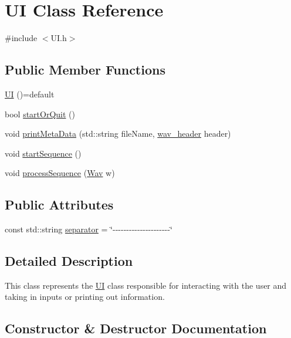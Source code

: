 \hypertarget{classUI}{}\section{UI Class Reference}
\label{classUI}


{\ttfamily \#include $<$U\+I.\+h$>$}

\subsection*{Public Member Functions}
\begin{DoxyCompactItemize}
\item 
\hyperlink{classUI_a3cd5131e957f45588b448c5c55ed0adf}{UI} ()=default
\item 
bool \hyperlink{classUI_ac9b2da5386256bf5d47e59306c3743a0}{start\+Or\+Quit} ()
\item 
void \hyperlink{classUI_a93d537361c79858e385c632bc147f63c}{print\+Meta\+Data} (std\+::string file\+Name, \hyperlink{structwav__header}{wav\+\_\+header} header)
\item 
void \hyperlink{classUI_abacdf6ae7042f82147d748c5669f5ca3}{start\+Sequence} ()
\item 
void \hyperlink{classUI_a3b363fd2cd390605325ec3fb348d9580}{process\+Sequence} (\hyperlink{classWav}{Wav} w)
\end{DoxyCompactItemize}
\subsection*{Public Attributes}
\begin{DoxyCompactItemize}
\item 
const std\+::string \hyperlink{classUI_a73df1331f3f022d956843672ad15d873}{separator} = \char`\"{}-\/-\/-\/-\/-\/-\/-\/-\/-\/-\/-\/-\/-\/-\/-\/-\/-\/-\/-\/-\/-\/\char`\"{}
\end{DoxyCompactItemize}


\subsection{Detailed Description}
This class represents the \hyperlink{classUI}{UI} class responsible for interacting with the user and taking in inputs or printing out information. 

\subsection{Constructor \& Destructor Documentation}
\mbox{\label{classUI_a3cd5131e957f45588b448c5c55ed0adf}} 

